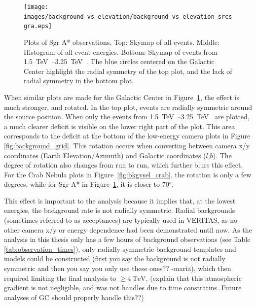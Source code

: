     \begin{figure}[!p]
      \centering
      \texttt{[image: images/background\_vs\_elevation/background\_vs\_elevation\_srcsgra.eps]}
      \caption[Background Vs Elevation Sgr A*]
      {\small 
        Plots of Sgr A* observations.
        Top: Skymap of all events.
        Middle: Histogram of all event energies.
        Bottom: Skymap of events from \SIrange{1.5}{3.25}{\TeV{}}.  
        The blue circles centered on the Galactic Center highlight the radial symmetry of the top plot, and the lack of radial symmetry in the bottom plot.
      }
      \label{fig:bkgvsel_sgra}
    \end{figure}
    
    When similar plots are made for the Galactic Center in Figure~\ref{fig:bkgvsel_sgra}, the effect is much stronger, and rotated.
    In the top plot, events are radially symmetric around the source position.
    When only the events from \SIrange{1.5}{3.25}{\TeV{}} are plotted, a much clearer deficit is visible on the lower right part of the plot.
    This area corresponds to the deficit at the bottom of the low-energy camera plots in Figure \ref{fig:background_grid}.
    This rotation occurs when converting between camera x/y coordinates (Earth Elevation/Azimuth) and Galactic coordinates ($l$,$b$).
    The degree of rotation also changes from run to run, which further blurs this effect.
    For the Crab Nebula plots in Figure~\ref{fig:bkgvsel_crab}, the rotation is only a few degrees, while for Sgr A* in Figure~\ref{fig:bkgvsel_sgra}, it is closer to \ang{70}.
    
    This effect is important to the analysis because it implies that, at the lowest energies, the background rate is not radially symmetric.
    Radial backgrounds (sometimes referred to as acceptances) are typically used in VERITAS, as no other camera x/y or energy dependence had been demonstrated until now.
    As the analysis in this thesis only has a few hours of background observations (see Table \ref{tab:observation_times}), {\color{red}only radially symmetric background templates and models could be constructed (first you say the background is not radially symmetric and then you say you only use these ones?? -maria)}, which then required limiting the final analysis to $\geq\SI{4}{\TeV{}}$.
    {\color{red}(explain that this atmospheric gradient is not negligible, and was not handles due to time constratins.  Future analyses of GC should properly handle this??)}
    
    \FloatBarrier

